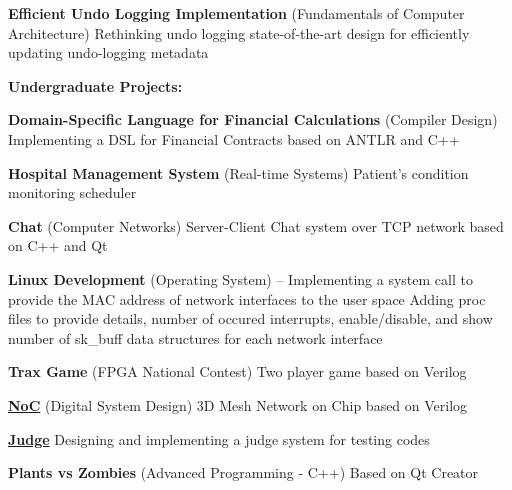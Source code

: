 \documentclass[a4paper,9pt,oneside]{article}
\begin{document}
\begin{body}
\BulletItem
{\textbf{Efficient Undo Logging Implementation}}
(Fundamentals of Computer Architecture)
\hfill
{}
\SubBulletItem
Rethinking undo logging state-of-the-art design for efficiently updating undo-logging metadata

\textbf{Undergraduate Projects:}

\BulletItem
\textbf{Domain-Specific Language for Financial Calculations} (Compiler Design)
\hfill
{}
\SubBulletItem
Implementing a DSL for Financial Contracts based on ANTLR and C++

\BulletItem
\textbf{Hospital Management System} (Real-time Systems)
\hfill
{}
\SubBulletItem
Patient's condition monitoring scheduler


\BulletItem
\textbf{Chat} (Computer Networks)
\hfill
{}
\SubBulletItem
Server-Client Chat system over TCP network based on C++ and Qt

\BulletItem
\textbf{Linux Development} (Operating System)
\hfill
{} -- 
\SubBulletItem
Implementing a system call to provide the MAC address of network interfaces to the user space
\SubBulletItem
Adding proc files to provide details, number of occured interrupts, enable/disable, and show number of sk\_buff data structures for each network interface

\BulletItem
\textbf{Trax Game} (FPGA National Contest)
\hfill
{}
\SubBulletItem
Two player game based on Verilog

\BulletItem
\href{https://github.com/arminvakil/NoC}
{\textbf{NoC}} (Digital System Design)
\hfill
{}
\SubBulletItem
3D Mesh Network on Chip based on Verilog

\BulletItem
\href{https://github.com/Rmin1995/Judge}
{\textbf{Judge}}
\hfill
{}
\SubBulletItem
Designing and implementing a judge system for testing codes

\BulletItem
\textbf{Plants vs Zombies} (Advanced Programming - C++)
\hfill
{}
\SubBulletItem
Based on Qt Creator


\end{body}
\end{document}
